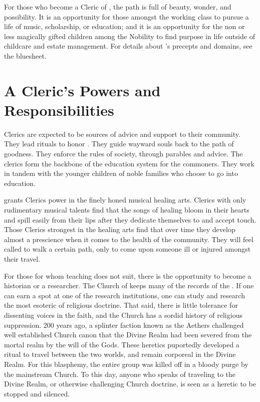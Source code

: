 \documentclass[blue]{GL2020}
\begin{document}
\name{\bCoSCleric{}}

For those who become a Cleric of \cFarmGod{}, the path is full of beauty, wonder, and possibility.  It is an opportunity for those amongst the working class to pursue a life of music, scholarship, or education; and it is an opportunity for the non or less magically gifted children among the Nobility to find purpose in life outside of childcare and estate management.  For details about \cFarmGod{}'s precepts and domains, see the \pFarm{} bluesheet.

\section{A Cleric's Powers and Responsibilities}
Clerics are expected to be sources of advice and support to their community.  They lead rituals to honor \cFarmGod{}.  They guide wayward souls back to the path of goodness.  They enforce the rules of society, through parables and advice.  The clerics form the backbone of the \pFarm{} education system for the commoners.  They work in tandem with the younger children of noble families who choose to go into education.  

\cFarmGod{} grants \cFarmGod{\their} Clerics power in the finely honed musical healing arts.  \pFarm{} Clerics with only rudimentary musical talents find that the songs of healing bloom in their hearts and spill easily from their lips after they dedicate themselves to \cFarmGod{} and accept \cFarmGod{\their} touch.  Those Clerics strongest in the healing arts find that over time they develop almost a prescience when it comes to the health of the community.  They will feel called to walk a certain path, only to come upon someone ill or injured amongst their travel.

For those for whom teaching does not suit, there is the opportunity to become a historian or a researcher.  The Church of \cFarmGod{} keeps many of the records of the \pFarm{}.  If one can earn a spot at one of the research institutions, one can study and research the most esoteric of religious doctrine.  That said, there is little tolerance for dissenting voices in the faith, and the Church has a sordid history of religious suppression.  200 years ago, a splinter faction known as the Aethers challenged well established Church canon that the Divine Realm had been severed from the mortal realm by the will of the Gods.  These heretics puportedly developed a ritual to travel between the two worlds, and remain corporeal in the Divine Realm.  For this blasphemy, the entire group was killed off in a bloody purge by the mainstream Church.  To this day, anyone who speaks of traveling to the Divine Realm, or otherwise challenging Church doctrine, is seen as a heretic to be stopped and silenced.
\end{document}
